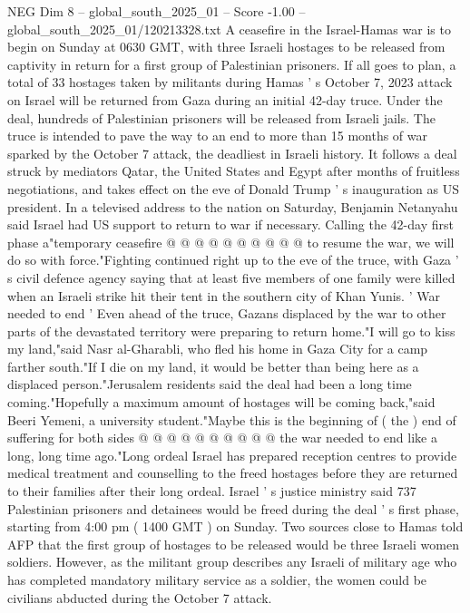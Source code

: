 \begin{textsample}{NEG Dim 8 – global\_south\_2025\_01 – Score -1.00 – global\_south\_2025\_01/120213328.txt}  \label{ex:f8_neg_336}
A ceasefire in the Israel-Hamas war is to begin on Sunday at 0630 GMT, with three Israeli hostages to be released from captivity in return for a first group of Palestinian prisoners.
If all goes to plan, a total of 33 hostages taken by militants during Hamas ' s October 7, 2023 attack on Israel will be returned from Gaza during an initial 42-day truce.
Under the deal, hundreds of Palestinian prisoners will be released from Israeli jails.
The truce is intended to pave the way to an end to more than 15 months of war sparked by the October 7 attack, the deadliest in Israeli history.
It follows a deal struck by mediators Qatar, the United States and Egypt after months of fruitless negotiations, and takes effect on the eve of Donald Trump ' s inauguration as US president.
In a televised address to the nation on Saturday, Benjamin Netanyahu said Israel had US support to return to war if necessary.
Calling the 42-day first phase a"temporary ceasefire @ @ @ @ @ @ @ @ @ @ to resume the war, we will do so with force."Fighting continued right up to the eve of the truce, with Gaza ' s civil defence agency saying that at least five members of one family were killed when an Israeli strike hit their tent in the southern city of Khan Yunis. ' War needed to end ' Even ahead of the truce, Gazans displaced by the war to other parts of the devastated territory were preparing to return home."I will go to kiss my land,"said Nasr al-Gharabli, who fled his home in Gaza City for a camp farther south."If I die on my land, it would be better than being here as a displaced person."Jerusalem residents said the deal had been a long time coming."Hopefully a maximum amount of hostages will be coming back,"said Beeri Yemeni, a university student."Maybe this is the beginning of ( the ) end of suffering for both sides @ @ @ @ @ @ @ @ @ @ the war needed to end like a long, long time ago."Long ordeal Israel has prepared reception centres to provide medical treatment and counselling to the freed hostages before they are returned to their families after their long ordeal.
Israel ' s justice ministry said 737 Palestinian prisoners and detainees would be freed during the deal ' s first phase, starting from 4:00 pm ( 1400 GMT ) on Sunday.
Two sources close to Hamas told AFP that the first group of hostages to be released would be three Israeli women soldiers.
However, as the militant group describes any Israeli of military age who has completed mandatory military service as a soldier, the women could be civilians abducted during the October 7 attack.

\end{textsample}
